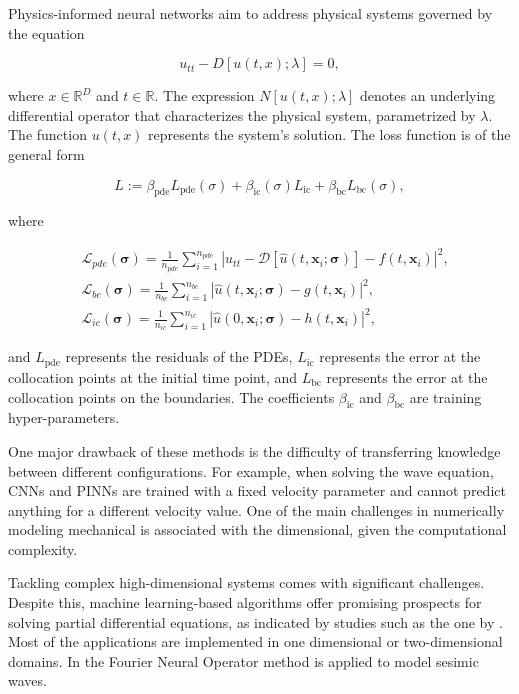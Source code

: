 \documentclass[11pt,twoside]{article}
\begin{document}
Physics-informed neural networks aim to address physical systems governed by the equation

$$
u_{tt} - D[u(t, x); \lambda] = 0,
$$

where \(x \in \mathbb{R}^D\) and \(t \in \mathbb{R}\). The expression \(N[u(t, x); \lambda]\) denotes an underlying differential operator 
that characterizes the physical system, parametrized by \(\lambda\). The function \(u(t, x)\) represents the system's solution. The loss 
function is of the general form 

$$ L := \beta_{\text{pde}}L_{\text{pde}}(\sigma) + \beta_{\text{ic}}(\sigma) L_{\text{ic}} + \beta_{\text{bc}} L_{\text{bc}}(\sigma) ,$$

where

$$
\begin{aligned}
& \mathcal{L}_{pde}(\boldsymbol{\sigma})=\frac{1}{n_{pde}} \sum_{i=1}^{n_{pde}}\left|u_{tt} - \mathcal{D}\left[\hat{u}\left(t,
 \boldsymbol{x}_i ; \boldsymbol{\sigma}\right)\right]-f\left(t, \boldsymbol{x}_i\right)\right|^2, \\
& \mathcal{L}_{bc}(\boldsymbol{\sigma})=\frac{1}{n_{bc}} \sum_{i=1}^{n_{bc}}\left|\hat{u}\left(t, \boldsymbol{x}_i ;
 \boldsymbol{\sigma}\right)-g\left(t, \boldsymbol{x}_i\right)\right|^2, \\
& \mathcal{L}_{ic}(\boldsymbol{\sigma})=\frac{1}{n_{ic}} \sum_{i=1}^{n_{ic}}\left|\hat{u}\left(0, \boldsymbol{x}_i ;
 \boldsymbol{\sigma}\right)-h\left(t,\boldsymbol{x}_i\right)\right|^2,
\end{aligned}
$$

and \( L_{\text{pde}} \) represents the residuals of the PDEs, \( L_{\text{ic}} \) represents the error at the collocation points at the 
initial time point, and \( L_{\text{bc}} \) represents the error at the collocation points on the boundaries. The coefficients 
\(\beta_{\text{ic}}\) and \(\beta_{\text{bc}}\) are training hyper-parameters.

One major drawback of these methods is the difficulty of transferring knowledge between different configurations. For example, when solving 
the wave equation, CNNs and PINNs are trained with a fixed velocity parameter and cannot predict anything for a different velocity value. 
One of the main challenges in numerically modeling mechanical is associated with the dimensional, given the computational complexity.

Tackling complex high-dimensional systems comes with significant challenges. Despite this, machine learning-based algorithms offer promising 
prospects for solving partial differential equations, as indicated by studies such as the one by . 
Most of the applications are implemented in one dimensional or two-dimensional domains. In  the Fourier 
Neural Operator method is applied to model sesimic waves.
\end{document}
